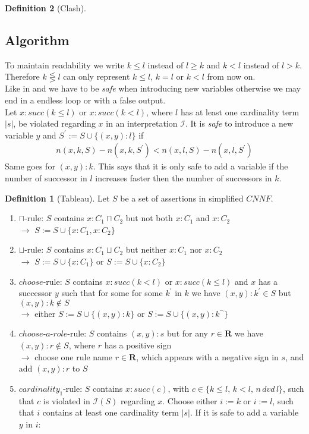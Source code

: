 \documentclass[a4paper,11pt]{scrartcl}
\theoremstyle{break}
\theoremstyle{definition}
\newtheorem{mydef}{Definition}
\begin{document}
\begin{mydef}[Clash]
\subsection{Algorithm}
\fi
To maintain readability we write $k\leq l$ instead of $l\geq k$ and $k<l$ instead of $l>k$. Therefore $k\lesseqgtr l$ can only represent $k\leq l$, $k=l$ or $k<l$ from now on.\\
Like in \cite{1} and \cite{6} we have to be \textit{safe} when introducing new variables otherwise we may end in a endless loop or with a false output.\\
Let $x:succ(k\leq l)$ or $x:succ(k<l)$, where $l$ has at least one cardinality term $|s|$, be violated regarding $x$ in an interpretation $\mathcal{I}$. It is \textit{safe} to introduce a new variable $y$ and $S^\prime:=S\cup\{(x,y):l\}$ if 
\begin{align*}
n(x,k,S)-n(x,k,S^\prime)<n(x,l,S)-n(x,l,S^\prime)
\end{align*}
Same goes for $(x,y):k$. This says that it is only safe to add a variable if the number of successor in $l$ increases faster then the number of successors in $k$.
\begin{mydef}[Tableau]
Let $S$ be a set of assertions in simplified $CNNF$.
\begin{enumerate}
\item\label{cap} $\sqcap$-rule: $S$ contains $x:C_1\sqcap C_2$ but not both $x:C_1$ and $x:C_2$\\
$\rightarrow$ $S:=S\cup\{x:C_1, x:C_2\}$
\item\label{cup} $\sqcup$-rule: $S$ contains $x:C_1\sqcup C_2$ but neither $x:C_1$ nor $x:C_2$\\
$\rightarrow$ $S:=S\cup\{x:C_1\}$ or $S:=S\cup\{x:C_2\}$
\item\label{choose}$choose$-rule: $S$ contains $x:succ(k<l)$ or $x:succ(k\leq l)$ and $x$ has a successor $y$ such that for some for some $k^\prime$ in $k$ we have $(x,y):k^\prime\in S$ but $(x,y):k\notin S$\\
$\rightarrow$ either $S:=S\cup\{(x,y):k\}$ or $S:=S\cup\{(x,y):k^\neg\}$
\item\label{chooserole}$choose$-$a$-$role$-rule: $S$ contains $(x,y):s$ but for any $r\in\mathbf{R}$ we have $(x,y):r\notin S$, where $r$ has a positive sign\\
$\rightarrow$ choose one rule name $r\in\mathbf{R}$, which appears with a negative sign in $s$, and add $(x,y):r$ to $S$
\item\label{setterm}$cardinality_1$-rule: $S$ contains $x:succ(c)$, with $c\in\{k\leq l,\,k<l,\,n\,dvd\,l\}$, such that $c$ is violated in $\mathcal{I}(S)$ regarding $x$. Choose either $i:=k$ or $i:=l$, such that $i$ contains at least one cardinality term $|s|$. If it is safe to add a variable $y$ in $i$:\\

\end{enumerate}
\end{mydef}
\end{mydef}
\end{document}
